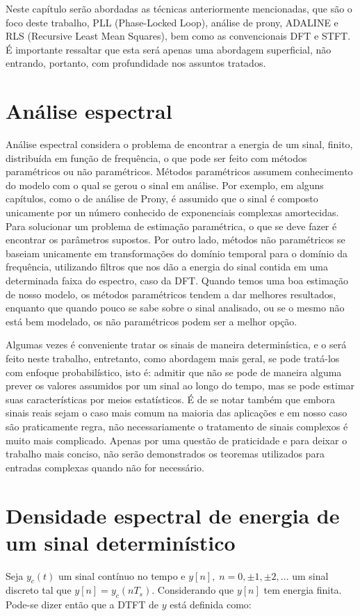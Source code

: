 
Neste capítulo serão abordadas as técnicas anteriormente mencionadas, que são o foco deste trabalho, PLL (Phase-Locked Loop), análise de prony, ADALINE e RLS (Recursive Least Mean Squares), bem como as convencionais DFT e STFT. É importante ressaltar que esta será apenas uma abordagem superficial, não entrando, portanto, com profundidade nos assuntos tratados.

\section{Análise espectral}
Análise espectral considera o problema de encontrar a energia de um sinal, finito, distribuída em função de frequência, o que pode ser feito com métodos paramétricos ou não paramétricos. Métodos paramétricos assumem conhecimento do modelo com o qual se gerou o sinal em análise. Por exemplo, em alguns capítulos, como o de análise de Prony, é assumido que o sinal é composto unicamente por un número conhecido de exponenciais complexas amortecidas. Para solucionar um problema de estimação paramétrica, o que se deve fazer é encontrar os parâmetros supostos. Por outro lado, métodos não paramétricos se baseiam unicamente em transformações do domínio temporal para o domínio da frequência, utilizando filtros que nos dão a energia do sinal contida em uma determinada faixa do espectro, caso da DFT. Quando temos uma boa estimação de nosso modelo, os métodos paramétricos tendem a dar melhores resultados, enquanto que quando pouco se sabe sobre o sinal analisado, ou se o mesmo não está bem modelado, os não paramétricos podem ser a melhor opção.

\indent Algumas vezes é conveniente tratar os sinais de maneira determinística, e o será feito neste trabalho, entretanto, como abordagem mais geral, se pode tratá-los com enfoque probabilístico, isto é: admitir que não se pode de maneira alguma prever os valores assumidos por um sinal ao longo do tempo, mas se pode estimar suas características por meios estatísticos.
\indent É de se notar também que embora sinais reais sejam o caso mais comum na maioria das aplicações e em nosso caso são praticamente regra, não necessariamente o tratamento de sinais complexos é muito mais complicado. Apenas por uma questão de praticidade e para deixar o trabalho mais conciso, não serão demonstrados os teoremas utilizados para entradas complexas quando não for necessário.\cite{stoica2005spectral}

\section{Densidade espectral de energia de um sinal determinístico}
Seja $y_c(t)$ um sinal contínuo no tempo e $y[n], \; n=0, \pm 1, \pm 2,...$  um sinal discreto tal que $y[n]=y_c(nT_s)$. Considerando que $y[n]$ tem energia finita. Pode-se dizer então que a DTFT de $y$ está definida como:

